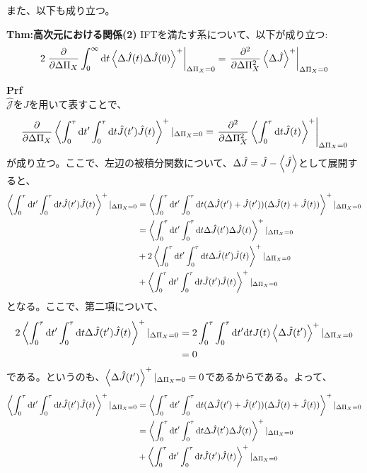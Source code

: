 \documentclass[a4paper,11pt]{jsarticle}
\begin{document}
また、以下も成り立つ。\\
\begin{itembox}[l]{\textbf{Thm:高次元における関係(2)}}
    IFTを満たす系について、以下が成り立つ:
    \begin{align}
        2\left.\pdv{\Delta \Pi_X} \int_0 ^{\infty} \dd t \ev{\Delta \hat{J}(t) \Delta \hat{J}(0)}^+\right|_{\Delta \Pi_X = 0} = \left.\pdv[2]{\Delta \Pi_X} \ev{\Delta \hat{J}}^+\right|_{\Delta \Pi_X = 0}
    \end{align}
\end{itembox}
\textbf{Prf}\\
$\hat{\mathcal{J}}$を$J$を用いて表すことで、
\begin{align}
    \pdv{\Delta \Pi_X} \ev{\int_0 ^{\tau} \dd t' \int_0 ^{\tau} \dd t \hat{J}(t')\hat{J}(t)}^+|_{\Delta \Pi_X = 0} = \left.\pdv[2]{\Delta \Pi_X} \ev{\int_0 ^{\tau} \dd t \hat{J}(t)}^+\right|_{\Delta \Pi_X = 0}
\end{align}
が成り立つ。ここで、左辺の被積分関数について、$\Delta \hat{J} = \hat{J} - \ev{\hat{J}}$として展開すると、
\begin{align}
    \ev{\int_0 ^{\tau} \dd t' \int_0 ^{\tau} \dd t \hat{J}(t')\hat{J}(t)}^+|_{\Delta \Pi_X = 0} &= \ev{\int_0 ^{\tau} \dd t' \int_0 ^{\tau} \dd t (\Delta \hat{J}(t') +\hat{J}(t'))(\Delta \hat{J}(t) +\hat{J}(t))}^+|_{\Delta \Pi_X = 0}\\
    &= \ev{\int_0 ^{\tau} \dd t' \int_0 ^{\tau} \dd t \Delta \hat{J}(t')\Delta \hat{J}(t)}^+|_{\Delta \Pi_X = 0} \\
    &+ 2\ev{\int_0 ^{\tau} \dd t' \int_0 ^{\tau} \dd t \Delta \hat{J}(t')\hat{J}(t)}^+|_{\Delta \Pi_X = 0}\\
    &+ \ev{\int_0 ^{\tau} \dd t' \int_0 ^{\tau} \dd t \hat{J}(t')\hat{J}(t)}^+|_{\Delta \Pi_X = 0}\\
\end{align}
となる。ここで、第二項について、
\begin{align}
    2\ev{\int_0 ^{\tau} \dd t' \int_0 ^{\tau} \dd t \Delta \hat{J}(t')\hat{J}(t)}^+|_{\Delta \Pi_X = 0} &= 2\int_0 ^{\tau} \int_0 ^{\tau} \dd t' \dd t J(t) \ev{\Delta \hat{J}(t')}^+|_{\Delta \Pi_X = 0}\\
    &= 0
\end{align}
である。というのも、$\ev{\Delta \hat{J}(t')}^+|_{\Delta \Pi_X = 0} = 0$であるからである。よって、
\begin{align}
    \ev{\int_0 ^{\tau} \dd t' \int_0 ^{\tau} \dd t \hat{J}(t')\hat{J}(t)}^+|_{\Delta \Pi_X = 0} &= \ev{\int_0 ^{\tau} \dd t' \int_0 ^{\tau} \dd t (\Delta \hat{J}(t') +\hat{J}(t'))(\Delta \hat{J}(t) +\hat{J}(t))}^+|_{\Delta \Pi_X = 0}\\
    &= \ev{\int_0 ^{\tau} \dd t' \int_0 ^{\tau} \dd t \Delta \hat{J}(t')\Delta \hat{J}(t)}^+|_{\Delta \Pi_X = 0} \\
    &+ \ev{\int_0 ^{\tau} \dd t' \int_0 ^{\tau} \dd t \hat{J}(t')\hat{J}(t)}^+|_{\Delta \Pi_X = 0}\\
\end{align}
\end{document}
